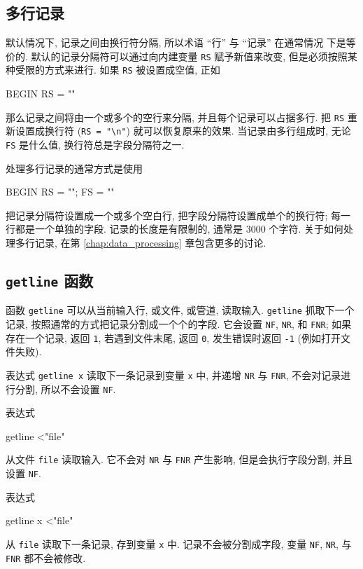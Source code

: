 \subsection{多行记录}
\label{subsec:multiline_records}

默认情况下, 记录之间由换行符分隔, 所以术语 ``行'' 与 ``记录'' 在通常情况
下是等价的. 默认的记录分隔符可以通过向内建变量 \verb'RS' 赋予新值来改变,
但是必须按照某种受限的方式来进行. 如果 \verb'RS' 被设置成空值, 正如
\begin{myverb}
    BEGIN { RS = "" }
\end{myverb}
那么记录之间将由一个或多个的空行来分隔, 并且每个记录可以占据多行. 把
\verb'RS' 重新设置成换行符 (\verb'RS = "\n"') 就可以恢复原来的效果.
当记录由多行组成时, 无论 \verb'FS' 是什么值, 换行符总是字段分隔符之一.

处理多行记录的通常方式是使用
\begin{myverb}
    BEGIN { RS = ""; FS = "\n" }
\end{myverb}
把记录分隔符设置成一个或多个空白行, 把字段分隔符设置成单个的换行符; 每一
行都是一个单独的字段. 记录的长度是有限制的, 通常是 3000 个字符.
关于如何处理多行记录, 在第 \ref{chap:data_processing} 章包含更多的讨论.

\subsection{\textbf{\texttt{getline}} 函数}
\label{subsec:the_getline_function}

函数 \verb'getline' 可以从当前输入行, 或文件, 或管道, 读取输入.
\verb'getline' 抓取下一个记录, 按照通常的方式把记录分割成一个个的字段.
它会设置 \verb'NF', \verb'NR', 和 \verb'FNR'; 如果存在一个记录, 返回
\verb'1',
若遇到文件末尾, 返回 \verb'0', 发生错误时返回 \verb'-1'
(例如打开文件失败).

表达式 \verb'getline x' 读取下一条记录到变量 \verb'x' 中, 并递增 \verb'NR'
与 \verb'FNR', 不会对记录进行分割, 所以不会设置 \verb'NF'.

表达式
\begin{myverb}
    getline <"file"
\end{myverb}
从文件 \verb'file' 读取输入. 它不会对 \verb'NR' 与 \verb'FNR' 产生影响,
但是会执行字段分割, 并且设置 \verb'NF'.

表达式
\begin{myverb}
    getline x <"file"
\end{myverb}
从 \verb'file' 读取下一条记录, 存到变量 \verb'x' 中. 记录不会被分割成字段,
变量 \verb'NF', \verb'NR', 与 \verb'FNR' 都不会被修改.

